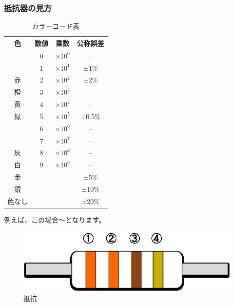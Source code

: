 \documentclass[11pt,a4paper]{jarticle}
\begin{document}
\subsubsection*{抵抗器の見方}
\begin{table}[htb]
 \begin{center}
  \caption{カラーコード表}
  \label{tb:colorCode}
  \begin{tabular}{|c|c|c|c|} \hline
   \hspace{1zw}色\hspace{1zw} & 数値 & 乗数 & 公称誤差 \\ \hline
   \cellcolor{black}\textcolor {white}{黒} & 0 & $×10^0$ & -- \\ \hline
   \cellcolor{Brown}\textcolor {white}茶 & 1 & $×10^1$ & ±1\% \\ \hline
   \cellcolor{red}赤 & 2 & $×10^2$ & ±2\% \\ \hline
   \cellcolor[rgb]{1.0, 0.5, 0.0}橙 & 3 & $×10^3$ & -- \\ \hline
   \cellcolor{yellow}黄 & 4 & $×10^4$ & -- \\ \hline
   \cellcolor{green}緑 & 5 & $×10^5$ & ±0.5\% \\ \hline
   \cellcolor{blue}\textcolor {white}青 & 6 & $×10^6$ & -- \\ \hline
   \cellcolor[rgb]{0.5, 0.0, 0.5}\textcolor {white}紫 & 7 & $×10^7$ & -- \\ \hline
   \cellcolor[rgb]{0.5, 0.5, 0.5}灰 & 8 & $×10^8$ & -- \\ \hline
   \cellcolor{white}白 & 9 & $×10^9$ & -- \\ \hline
   \cellcolor[rgb]{0.83, 0.69, 0.22}金 &   &   & ±5\%  \\ \hline
   \cellcolor[rgb]{0.75, 0.75, 0.75}銀 &   &   & ±10\%  \\ \hline
   \cellcolor[rgb]{0.96, 0.96, 0.86}色なし &   &   & ±20\%  \\ \hline
  \end{tabular}
 \end{center}
\end{table}

例えば、この場合〜となります。
\begin{figure}
  \centering
  \includegraphics[width=0.5\columnwidth]{img/resistance.eps}
  \caption{抵抗}
\end{figure}
\end{document}
